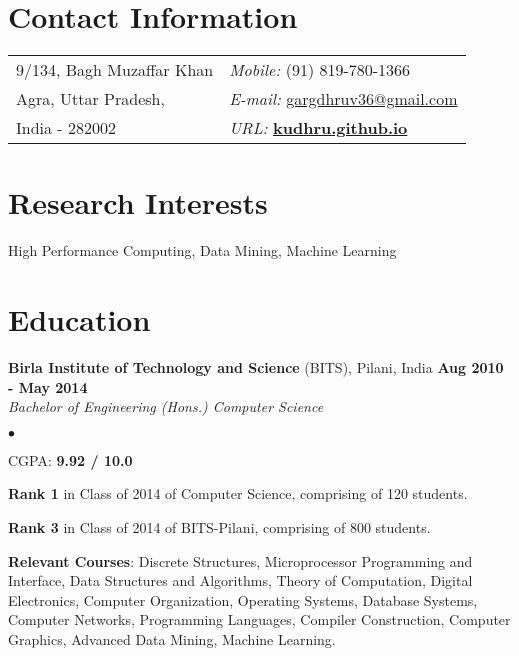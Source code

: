 \documentclass[margin,line]{res}
\newenvironment{list2}{
  \begin{list}{$\bullet$}{%
      \setlength{\itemsep}{0in}
      \setlength{\parsep}{0in} \setlength{\parskip}{0in}
      \setlength{\topsep}{0in} \setlength{\partopsep}{0in} 
      \setlength{\leftmargin}{0.2in}}}{\end{list}}
\begin{document}

\begin{resume}
\section{\sc Contact Information}
\vspace{.05in}
\begin{tabular}{@{}p{3in}p{4in}}
9/134, Bagh Muzaffar Khan         & {\it Mobile:}  (91) 819-780-1366 \\            
 Agra, Uttar Pradesh, & {\it E-mail:}  \href{mailto:gargdhruv36@gmail.com }{gargdhruv36@gmail.com }\\
 India - 282002 &{\it URL:}  \href{http://kudhru.github.io}{\bf kudhru.github.io}
\end{tabular}


\section{\sc Research Interests}
High Performance Computing, Data Mining, Machine Learning

\section{\sc Education}
{\bf Birla Institute of Technology and Science} (BITS), Pilani, India \hfill {\bf {Aug 2010 - May 2014}}\\
{\em Bachelor of Engineering (Hons.) Computer Science }
\vspace*{.3cm}
\begin{list2}
\item CGPA:  {\bf {9.92 / 10.0}}
\item {\bf Rank 1} in Class of 2014 of Computer Science, comprising of 120 students. 
\item {\bf Rank 3} in Class of 2014 of BITS-Pilani, comprising of 800 students.
\item {\bf Relevant Courses}: Discrete Structures, Microprocessor Programming
and Interface, Data Structures and Algorithms, Theory of Computation, Digital Electronics,
Computer Organization, Operating Systems, Database Systems, Computer Networks,
Programming Languages, Compiler Construction, Computer Graphics, Advanced Data Mining, Machine Learning.


\end{list2}
\end{resume}
\end{document}
